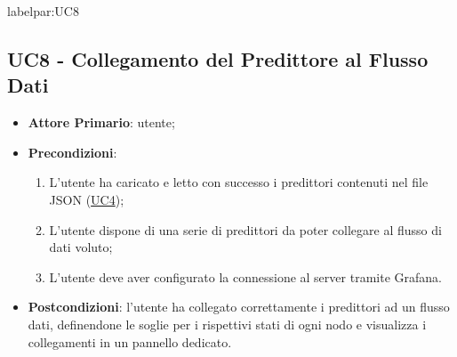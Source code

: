 	
	label{par:UC8}
	\subsection{UC8 - Collegamento del Predittore al Flusso Dati}
		\begin{itemize}
			\item\textbf{Attore Primario}: utente;
			\item\textbf{Precondizioni}: 
				\begin{enumerate}
					\item L’utente ha caricato e letto con successo i predittori contenuti nel file JSON (\hyperref[par:UC4]{UC4});
					\item L’utente dispone di una serie di predittori da poter collegare al flusso di dati voluto;
					\item L’utente deve aver configurato la connessione al server tramite Grafana.	
				\end{enumerate}
			\item\textbf{Postcondizioni}: l’utente ha collegato correttamente i predittori ad un flusso dati, definendone le soglie per i rispettivi stati di ogni nodo e visualizza i collegamenti in un pannello dedicato. 


\end{itemize}
